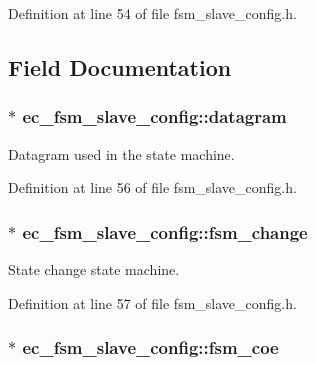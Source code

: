 Definition at line 54 of file fsm\-\_\-slave\-\_\-config.\-h.



\subsection{Field Documentation}
\subsubsection[{datagram}]{$\ast$ ec\-\_\-fsm\-\_\-slave\-\_\-config\-::datagram}\label{structec__fsm__slave__config_a6b7e0ac3aa324aede3c39467672f7201}


Datagram used in the state machine. 



Definition at line 56 of file fsm\-\_\-slave\-\_\-config.\-h.

\subsubsection[{fsm\-\_\-change}]{$\ast$ ec\-\_\-fsm\-\_\-slave\-\_\-config\-::fsm\-\_\-change}\label{structec__fsm__slave__config_a1e2372d1d2ca00c551f93a503d06586d}


State change state machine. 



Definition at line 57 of file fsm\-\_\-slave\-\_\-config.\-h.

\subsubsection[{fsm\-\_\-coe}]{$\ast$ ec\-\_\-fsm\-\_\-slave\-\_\-config\-::fsm\-\_\-coe}\label{structec__fsm__slave__config_a6c1f6900f5043f39d2d11250e5738dd0}


